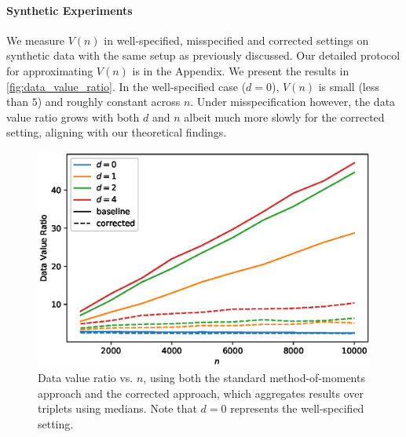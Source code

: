 \vspace{-0.5em}
\paragraph{Synthetic Experiments} We measure $V(n)$ in well-specified, misspecified and corrected settings on synthetic data with the same setup as previously discussed. Our detailed protocol for approximating $V(n)$ is in the Appendix. 
We present the results in \autoref{fig:data_value_ratio}. In the well-specified case ($d = 0$), $V(n)$ is small (less than $5$) and roughly constant across $n$. Under misspecification however, the data value ratio grows with both $d$ and $n$ albeit much more slowly for the corrected setting, aligning with our theoretical findings.

\begin{figure}
    \centering
    \includegraphics[width=.3\textwidth]{eps_figures/data_value_ratio_vs_n.eps}
    \caption{Data value ratio vs. $n$, using both the standard method-of-moments approach and the corrected approach, which aggregates results over triplets using medians. Note that $d=0$ represents the well-specified setting. %
    }
    \label{fig:data_value_ratio}
\end{figure}

